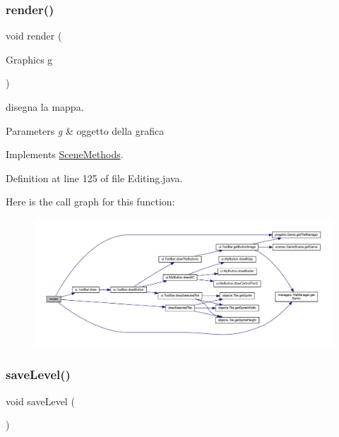 \subsubsection{\texorpdfstring{render()}{render()}}
{\footnotesize\ttfamily void render (\begin{DoxyParamCaption}\item[{Graphics}]{g }\end{DoxyParamCaption})}



disegna la mappa. 


\begin{DoxyParams}{Parameters}
{\em g} & oggetto della grafica \\
\hline
\end{DoxyParams}


Implements \hyperlink{interfacescenes_1_1_scene_methods_a203b6ad9d5e4d54dd1152986eec4dedc}{Scene\+Methods}.



Definition at line 125 of file Editing.\+java.

Here is the call graph for this function\+:\nopagebreak
\begin{figure}[H]
\begin{center}
\leavevmode
\includegraphics[width=350pt]{classscenes_1_1_editing_a203b6ad9d5e4d54dd1152986eec4dedc_cgraph}
\end{center}
\end{figure}
\mbox{\label{classscenes_1_1_editing_af1c1bf274cd89c18726a992a073a7c6d}} 
\subsubsection{\texorpdfstring{save\+Level()}{saveLevel()}}
{\footnotesize\ttfamily void save\+Level (\begin{DoxyParamCaption}{ }\end{DoxyParamCaption})}



